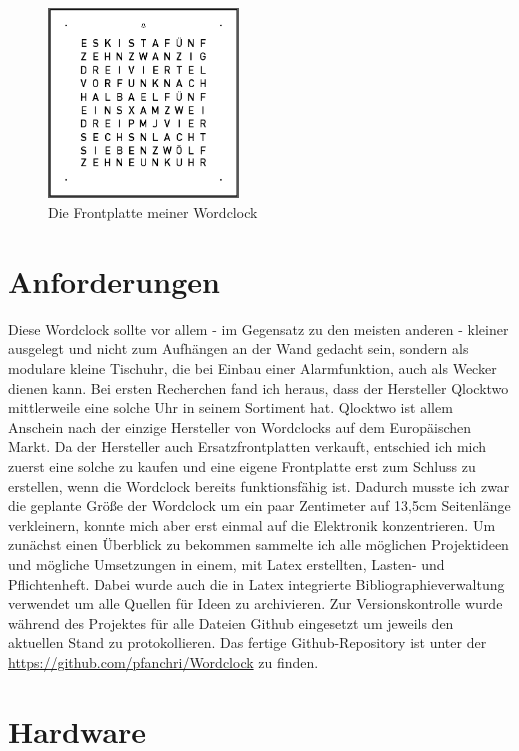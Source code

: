 \documentclass[12pt,journal,compsoc]{IEEEtran}
\begin{document}
\begin{figure}
	\centering
	\includegraphics[width=0.45\textwidth]{Bilder/Frontplatte1}
	\caption{Die Frontplatte meiner Wordclock} 
	\label{fig:Frontplatte1}
\end{figure}

\section{Anforderungen}
Diese Wordclock sollte vor allem - im Gegensatz zu den meisten anderen - kleiner ausgelegt und nicht zum Aufhängen an der Wand gedacht sein, sondern als modulare kleine Tischuhr, die bei Einbau einer Alarmfunktion, auch als Wecker dienen kann.
Bei ersten Recherchen fand ich heraus, dass der Hersteller Qlocktwo mittlerweile eine solche Uhr in seinem Sortiment hat. Qlocktwo ist allem Anschein nach der einzige Hersteller von Wordclocks auf dem Europäischen Markt. Da der Hersteller auch Ersatzfrontplatten verkauft, entschied ich mich zuerst eine solche zu kaufen und eine eigene Frontplatte erst zum Schluss zu erstellen, wenn die Wordclock bereits funktionsfähig ist. Dadurch musste ich zwar die geplante Größe der Wordclock um ein paar Zentimeter auf 13,5cm Seitenlänge verkleinern, konnte mich aber erst einmal auf die Elektronik konzentrieren.
Um zunächst einen Überblick zu bekommen sammelte ich alle möglichen Projektideen und mögliche Umsetzungen in einem, mit Latex erstellten, Lasten- und Pflichtenheft. Dabei wurde auch die in Latex integrierte Bibliographieverwaltung verwendet um alle Quellen für Ideen zu archivieren. Zur Versionskontrolle wurde während des Projektes für alle Dateien Github eingesetzt um jeweils den aktuellen Stand zu protokollieren. Das fertige Github-Repository ist unter der \url{https://github.com/pfanchri/Wordclock} zu finden.


\section{Hardware}
\end{document}
